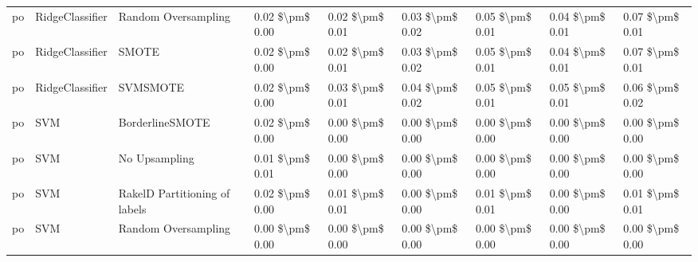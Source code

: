 \begin{tabular}{lllllllll}
      po &                 RidgeClassifier &           Random Oversampling & 0.02 \$\textbackslash pm\$ 0.00 &           0.02 \$\textbackslash pm\$ 0.01 &       0.03 \$\textbackslash pm\$ 0.02 &        0.05 \$\textbackslash pm\$ 0.01 &                         0.04 \$\textbackslash pm\$ 0.01 &     0.07 \$\textbackslash pm\$ 0.01 \\
      po &                 RidgeClassifier &                         SMOTE & 0.02 \$\textbackslash pm\$ 0.00 &           0.02 \$\textbackslash pm\$ 0.01 &       0.03 \$\textbackslash pm\$ 0.02 &        0.05 \$\textbackslash pm\$ 0.01 &                         0.04 \$\textbackslash pm\$ 0.01 &     0.07 \$\textbackslash pm\$ 0.01 \\
      po &                 RidgeClassifier &                      SVMSMOTE & 0.02 \$\textbackslash pm\$ 0.00 &           0.03 \$\textbackslash pm\$ 0.01 &       0.04 \$\textbackslash pm\$ 0.02 &        0.05 \$\textbackslash pm\$ 0.01 &                         0.05 \$\textbackslash pm\$ 0.01 &     0.06 \$\textbackslash pm\$ 0.02 \\
      po &                             SVM &               BorderlineSMOTE & 0.02 \$\textbackslash pm\$ 0.00 &           0.00 \$\textbackslash pm\$ 0.00 &       0.00 \$\textbackslash pm\$ 0.00 &        0.00 \$\textbackslash pm\$ 0.00 &                         0.00 \$\textbackslash pm\$ 0.00 &     0.00 \$\textbackslash pm\$ 0.00 \\
      po &                             SVM &                 No Upsampling & 0.01 \$\textbackslash pm\$ 0.01 &           0.00 \$\textbackslash pm\$ 0.00 &       0.00 \$\textbackslash pm\$ 0.00 &        0.00 \$\textbackslash pm\$ 0.00 &                         0.00 \$\textbackslash pm\$ 0.00 &     0.00 \$\textbackslash pm\$ 0.00 \\
      po &                             SVM & RakelD Partitioning of labels & 0.02 \$\textbackslash pm\$ 0.00 &           0.01 \$\textbackslash pm\$ 0.01 &       0.00 \$\textbackslash pm\$ 0.00 &        0.01 \$\textbackslash pm\$ 0.01 &                         0.00 \$\textbackslash pm\$ 0.00 &     0.01 \$\textbackslash pm\$ 0.01 \\
      po &                             SVM &           Random Oversampling & 0.00 \$\textbackslash pm\$ 0.00 &           0.00 \$\textbackslash pm\$ 0.00 &       0.00 \$\textbackslash pm\$ 0.00 &        0.00 \$\textbackslash pm\$ 0.00 &                         0.00 \$\textbackslash pm\$ 0.00 &     0.00 \$\textbackslash pm\$ 0.00 \\

\end{tabular}
